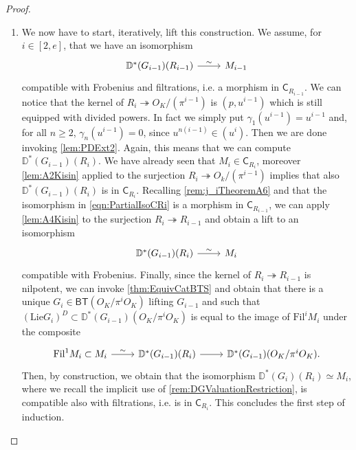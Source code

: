 \begin{proof}
\begin{enumerate}
\item We now have to start, iteratively, lift this construction.
	We assume, for $i \in [2,e]$, that we have an isomorphism
	\begin{equation}\label{eqn:PartialIsoCRi}
	\begin{tikzcd}
	\mathbb{D}^*(G_{i-1})(R_{i-1}) 
	\arrow[r, "\sim", rightarrow] &
	M_{i-1}
	\end{tikzcd}
	\end{equation}
	compatible with Frobenius and filtrations, i.e. a morphism in $\mathsf{C}_{R_{i-1}}$.
	We can notice that the kernel of $R_i \twoheadrightarrow O_K/ (\pi^{i-1})$
	is $(p, u^{i-1})$ which is still equipped with divided powers.
	In fact we simply put $\gamma_1(u^{i-1}) = u^{i-1}$ and, for all $n \geq 2$,
	$\gamma_n(u^{i-1}) = 0$, since $u^{n(i-1)} \in (u^i)$.
	Then we are done invoking \cref{lem:PDExt2}.
	Again, this means that we can compute $\mathbb{D}^*(G_{i-1})(R_i)$.
	We have already seen that $M_i \in \mathsf{C}_{R_i}$, moreover \cref{lem:A2Kisin}
	applied to the surjection $R_i \twoheadrightarrow O_k/ (\pi^{i-1})$ implies that
	also $\mathbb{D}^*(G_{i-1})(R_i)$ is in $\mathsf{C}_{R_i}$.
	Recalling \cref{rem:j_iTheoremA6} and that the isomorphism in \cref{eqn:PartialIsoCRi}
	is a morphism in $\mathsf{C}_{R_{i-1}}$, 
	we can apply \cref{lem:A4Kisin} to the surjection $R_i \twoheadrightarrow R_{i-1}$
	and obtain a lift to an isomorphism
	\begin{equation*}
	\begin{tikzcd}
	\mathbb{D}^*(G_{i-1})(R_{i}) 
	\arrow[r, "\sim", rightarrow] &
	M_{i}
	\end{tikzcd}
	\end{equation*}
	compatible with Frobenius.
	Finally, since the kernel of $R_i \twoheadrightarrow R_{i-1}$ is nilpotent,
	we can invoke \cref{thm:EquivCatBTS} and obtain that
	there is a unique $G_i \in \mathsf{BT}(O_K/\pi^iO_K)$
	lifting $G_{i-1}$ and such that $(\mathrm{Lie}G_i)^D \subset \mathbb{D}^*(G_{i-1})(O_K/\pi^i O_K)$
	is equal to the image of $\mathrm{Fil}^i M_i$ under the composite
	\begin{equation*}
	\begin{tikzcd}
		\mathrm{Fil}^1 M_i \subset M_i
		\arrow[r, "\sim", rightarrow] &
		\mathbb{D}^*(G_{i-1})(R_i)
		\arrow[r, "", rightarrow] &
		\mathbb{D}^*(G_{i-1})(O_K/\pi^iO_K)
	.\end{tikzcd}
	\end{equation*}
	Then, by construction, we obtain that the isomorphism
	$\mathbb{D}^*(G_i)(R_i) \simeq M_i$, where we recall the implicit use of 
	\cref{rem:DGValuationRestriction}, is compatible also with filtrations,
	i.e. is in $\mathsf{C}_{R_i}$.
	This concludes the first step of induction.


\end{enumerate}
\end{proof}
